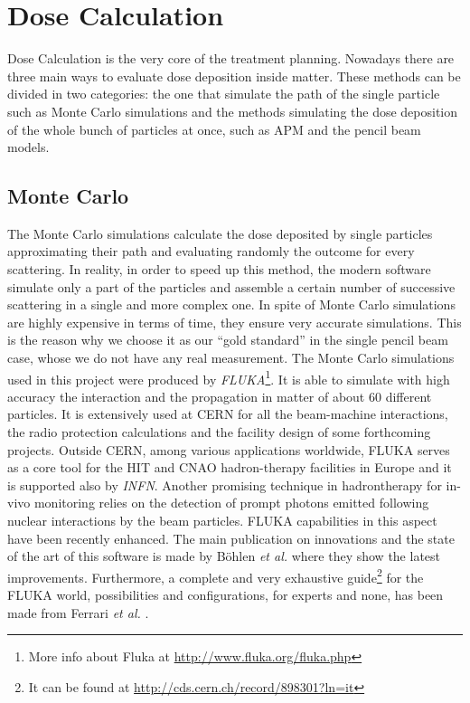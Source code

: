 \documentclass[12pt, a4paper, twoside]{book}
\begin{document}




\section{Dose Calculation}
Dose Calculation is the very core of the treatment planning. 
Nowadays there are three main ways to evaluate dose deposition inside matter. These methods can be divided in two categories: the one that simulate the path of the single particle such as Monte Carlo simulations and the methods simulating the dose deposition of the whole bunch of particles at once, such as APM and the pencil beam models.




\subsection{Monte Carlo}
The Monte Carlo simulations calculate the dose deposited by single particles approximating their path and evaluating randomly the outcome for every scattering. In reality, in order to speed up this method, the modern software simulate only a part of the particles and assemble a certain number of successive scattering in a single and more complex one. In spite of Monte Carlo simulations are highly expensive in terms of time, they ensure very accurate simulations. This is the reason why we choose it as our ``gold standard'' in the single pencil beam case, whose we do not have any real measurement.
The Monte Carlo simulations used in this project were produced by \emph{FLUKA}\footnote{More info about Fluka at \url{http://www.fluka.org/fluka.php}}. It is able to simulate with high accuracy the interaction and the propagation in matter of about 60 different particles. It is extensively used at CERN for all the beam-machine interactions, the radio protection calculations and the facility design of some forthcoming projects. 
Outside CERN, among various applications worldwide, FLUKA serves as a core tool for the HIT and CNAO hadron-therapy facilities in Europe and it is supported also by \emph{INFN}.
Another promising technique in hadrontherapy for in-vivo monitoring relies on the detection of prompt photons emitted following nuclear interactions by the beam particles. FLUKA capabilities in this aspect have been recently enhanced.
The main publication on innovations and the state of the art of this software is made by B\"ohlen \emph{et al.} \cite{boeh:fluka} where they show the latest improvements.
Furthermore, a complete and very exhaustive guide\footnote{It can be found at \url{http://cds.cern.ch/record/898301?ln=it}} for the FLUKA world, possibilities and configurations, for experts and none, has been made from Ferrari \emph{et al.} \cite{ferr:fluka}.
\end{document}
